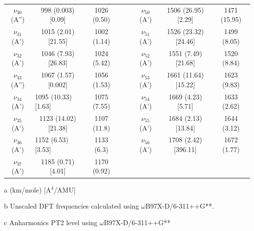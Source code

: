 \begin{table}[H]
\begin{center}
\begin{threeparttable}
{\begin{tabular}{c c c c c c c c}
$\nu_{30}$ (A”) & 998 (0.003) [0.09] & 1026 (0.50) &  &  & $\nu_{50}$ (A’) & 1506 (26.95) [2.29] & 1471 (15.95) \\ 
\multicolumn{1}{c}{$\nu_{31}$ (A’)} & 1015 (2.01) [21.55] & 1002 (1.14) &  &  & $\nu_{51}$ (A’) & 1526 (23.32) [24.46] & 1499 (8.05) \\ 
\multicolumn{1}{c}{$\nu_{32}$ (A’)} & 1046 (7.93) [26.83] & 1024 (5.42) &  &  & $\nu_{52}$ (A’) & 1551 (7.49) [21.68] & 1520 (8.84) \\ 
\multicolumn{1}{c}{$\nu_{33}$ (A”)} & 1067 (1.57) [0.002] & 1056 (1.53) &  &  & $\nu_{53}$ (A’) & 1661 (11.64) [15.22] & 1623 (9.83) \\ 
\multicolumn{1}{c}{$\nu_{34}$ (A’)} & \multicolumn{1}{l}{1095 (10.33) [1.63]} & 1075 (7.55) &  &  & $\nu_{54}$ (A’) & 1669 (4.23) [5.71] & 1633 (2.62) \\ 
\multicolumn{1}{c}{$\nu_{35}$ (A’)} & 1123 (14.02) [21.38] & 1107 (11.8) &  &  & $\nu_{55}$ (A’) & 1684 (2.13) [13.84] & 1644 (3.12) \\ 
\multicolumn{1}{c}{$\nu_{36}$ (A’)} & \multicolumn{1}{l}{1152 (6.53) [3.53]} & 1133 (6.3) &  &  & $\nu_{56}$ (A’) & 1708 (2.42) [396.11] & 1672 (1.77) \\ 
$\nu_{37}$ (A’)&	1185 (0.71) [4.01]&	1170 (0.92)& &  &   &   &  \\
\bottomrule
\end{tabular}}

\begin{tablenotes}
	\item[a] (km/mole) [A$^{4}$/AMU]
	\item[b] Unscaled DFT frequencies calculated using $\omega$B97X-D/6-311++G**.
	\item[c] Anharmonics PT2 level using $\omega$B97X-D/6-311++G** 
\end{tablenotes}
\end{threeparttable}
\end{center}
\label{freq-4-methyldibenzofuran}
\end{table}


